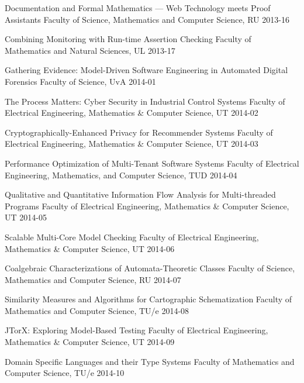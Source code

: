 \begin{multicols}{2}
         {Documentation and Formal Mathematics --- Web Technology meets Proof Assistants}
         {Faculty of Science, Mathematics and Computer Science, RU}
         {2013-16}

         {Combining Monitoring with Run-time Assertion Checking}
         {Faculty of Mathematics and Natural Sciences, UL}
         {2013-17}

         {Gathering Evidence: Model-Driven Software Engineering in Automated Digital Forensics}
         {Faculty of Science, UvA}
         {2014-01}

         {The Process Matters: Cyber Security in Industrial Control Systems}
         {Faculty of Electrical Engineering, Mathematics \& Computer Science, UT}
         {2014-02}

         {Cryptographically-Enhanced Privacy for Recommender Systems}
         {Faculty of Electrical Engineering, Mathematics \& Computer Science, UT}
         {2014-03}

         {Performance Optimization of Multi-Tenant Software Systems}
         {Faculty of Electrical Engineering, Mathematics, and Computer Science, TUD}
         {2014-04}

         {Qualitative and Quantitative Information Flow Analysis for Multi-threaded Programs}
         {Faculty of Electrical Engineering, Mathematics \& Computer Science, UT}
         {2014-05}

         {Scalable Multi-Core Model Checking}
         {Faculty of Electrical Engineering, Mathematics \& Computer Science, UT}
         {2014-06}

         {Coalgebraic Characterizations of Automata-Theoretic Classes}
         {Faculty of Science, Mathematics and Computer Science, RU}
         {2014-07}


         {Similarity Measures and Algorithms for Cartographic Schematization}
         {Faculty of Mathematics and Computer Science, TU/e}
         {2014-08}

         {JTorX: Exploring Model-Based Testing}
         {Faculty of Electrical Engineering, Mathematics \& Computer Science, UT}
         {2014-09}

         {Domain Specific Languages and their Type Systems}
         {Faculty of Mathematics and Computer Science, TU/e}
         {2014-10}


\end{multicols}
